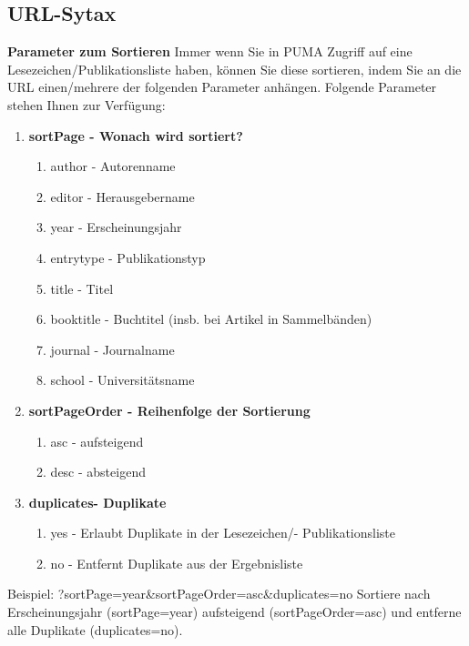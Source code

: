 \documentclass[b5paper,11pt,twoside]{scrbook} %
\begin{document}
\subsection{URL-Sytax}
\textbf{Parameter zum Sortieren} \newline
Immer wenn Sie in PUMA Zugriff auf eine Lesezeichen/Publikationsliste haben, können Sie diese sortieren, indem Sie an die URL einen/mehrere der folgenden Parameter anhängen. Folgende Parameter stehen Ihnen zur Verfügung:
\begin{enumerate}
    \item \textbf{sortPage - Wonach wird sortiert?}
    \begin{enumerate}
        \item author - Autorenname
        \item editor - Herausgebername
        \item year - Erscheinungsjahr
        \item entrytype - Publikationstyp
        \item title - Titel
        \item booktitle - Buchtitel (insb. bei Artikel in Sammelbänden)
        \item journal - Journalname
        \item school - Universitätsname 
    \end{enumerate}
    \item \textbf{sortPageOrder - Reihenfolge der Sortierung}
    \begin{enumerate}
        \item asc - aufsteigend
        \item desc - absteigend 
    \end{enumerate}
    \item \textbf{duplicates- Duplikate}
    \begin{enumerate}
        \item yes - Erlaubt Duplikate in der Lesezeichen/- Publikationsliste
        \item no - Entfernt Duplikate aus der Ergebnisliste
    \end{enumerate}
\end{enumerate}
Beispiel: ?sortPage=year\&sortPageOrder=asc\&duplicates=no \newline
Sortiere nach Erscheinungsjahr (sortPage=year) aufsteigend (sortPageOrder=asc) und entferne alle Duplikate (duplicates=no). \newline
\end{document}

